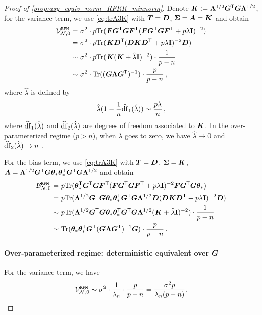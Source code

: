 \begin{proof}[Proof of \cref{prop:asy_equiv_norm_RFRR_minnorm}]
Denote $ \bK:=\bLambda^{1/2}\bG^\sT\bG\bLambda^{1/2}$, for the variance term, we use \cref{eq:trA3K} with $\bT=\bD$, $\bSigma=\bA=\bK$ and obtain 
\[
\begin{aligned}
\mathcal{V}_{\mathcal{N},0}^{\tt RFM} =&~ \sigma^2 \cdot p\Tr(\bF\bG^\sT \bG \bF^\sT(\bF\bG^\sT \bG \bF^\sT + p\lambda\id)^{-2})\\
=&~ \sigma^2 \cdot p\Tr(\bK \bD^\sT (\bD \bK \bD^\sT + p\lambda\id)^{-2} \bD)\\
\sim&~ \sigma^2 \cdot p\Tr(\bK (\bK + \hat\lambda\id)^{-2}) \cdot \frac{1}{p-n}\\
\sim&~ \sigma^2 \cdot \Tr( (\bG \bLambda \bG^\sT )^{-1}) \cdot \frac{p}{p-n}\,,
\end{aligned}
\]
where $\hat\lambda$ is defined by
\begin{equation}\label{eq:hat_lambda}
    \hat\lambda(1-\frac{1}{n}\widehat{\rm df}_1(\hat\lambda)) \sim \frac{p\lambda}{n}\,,
\end{equation}
where $\widehat{\rm df}_1(\hat\lambda)$ and $\widehat{\rm df}_2(\hat\lambda)$ are degrees of freedom associated to $\bK$. In the over-parameterized regime ($p>n$), when $\lambda$ goes to zero, we have $\hat\lambda \to 0$ and  $\widehat{\rm df}_2(\hat\lambda) \to n$ \citep{bach2024high}.

For the bias term, we use \cref{eq:trA3K} with $\bT=\bD$, $\bSigma=\bK$, $\bA=\bLambda^{1/2} \bG^\sT \bG \btheta_* \btheta_*^\sT \bG^\sT \bG \bLambda^{1/2}$ and obtain 
\[
\begin{aligned}
\mathcal{B}_{\mathcal{N},0}^{\tt RFM} =&~ p\Tr(\btheta_*^\sT \bG^\sT \bG \bF^\sT (\bF \bG^\sT \bG \bF^\sT + p\lambda\id)^{-2} \bF \bG^\sT \bG \btheta_* )\\
=&~ p\Tr(\bLambda^{1/2} \bG^\sT \bG \btheta_* \btheta_*^\sT \bG^\sT \bG \bLambda^{1/2} \bD (\bD \bK \bD^\sT + p\lambda\id)^{-2} \bD )\\
\sim&~ p\Tr(\bLambda^{1/2} \bG^\sT \bG \btheta_* \btheta_*^\sT \bG^\sT \bG \bLambda^{1/2} (\bK + \hat\lambda\id)^{-2} ) \cdot \frac{1}{p-n}\\
\sim&~ \Tr( \btheta_* \btheta_*^\sT \bG^\sT (\bG \bLambda \bG^\sT)^{-1} \bG ) \cdot \frac{p}{p-n}\,.
\end{aligned}
\]

\paragraph{Over-parameterized regime: deterministic equivalent over $\bG$}

For the variance term, we have
\[
\begin{aligned}
\mathcal{V}_{\mathcal{N},0}^{\tt RFM} \sim \sigma^2 \cdot \frac{1}{\lambda_n} \cdot \frac{p}{p-n} = \frac{\sigma^2p}{\lambda_n(p-n)}.
\end{aligned}
\]


\end{proof}
